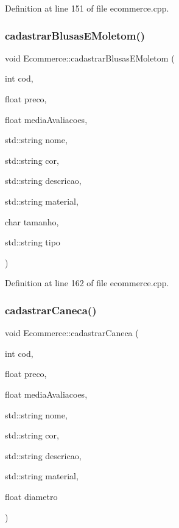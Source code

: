 Definition at line 151 of file ecommerce.\+cpp.

\mbox{\label{class_ecommerce_a479cdb4dd12a289222a2bced3364fba9}} 
\subsubsection{\texorpdfstring{cadastrar\+Blusas\+E\+Moletom()}{cadastrarBlusasEMoletom()}}
{\footnotesize\ttfamily void Ecommerce\+::cadastrar\+Blusas\+E\+Moletom (\begin{DoxyParamCaption}\item[{int}]{cod,  }\item[{float}]{preco,  }\item[{float}]{media\+Avaliacoes,  }\item[{std\+::string}]{nome,  }\item[{std\+::string}]{cor,  }\item[{std\+::string}]{descricao,  }\item[{std\+::string}]{material,  }\item[{char}]{tamanho,  }\item[{std\+::string}]{tipo }\end{DoxyParamCaption})}



Definition at line 162 of file ecommerce.\+cpp.

\mbox{\label{class_ecommerce_ad47414b6fefec3afe06204db4e22f23a}} 
\subsubsection{\texorpdfstring{cadastrar\+Caneca()}{cadastrarCaneca()}}
{\footnotesize\ttfamily void Ecommerce\+::cadastrar\+Caneca (\begin{DoxyParamCaption}\item[{int}]{cod,  }\item[{float}]{preco,  }\item[{float}]{media\+Avaliacoes,  }\item[{std\+::string}]{nome,  }\item[{std\+::string}]{cor,  }\item[{std\+::string}]{descricao,  }\item[{std\+::string}]{material,  }\item[{float}]{diametro }\end{DoxyParamCaption})}



